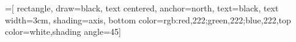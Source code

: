 =[
    rectangle,
    draw=black,
    text centered,
    anchor=north,
    text=black,
    text width=3cm,
    shading=axis,
    bottom color={rgb:red,222;green,222;blue,222},top color=white,shading angle=45]

